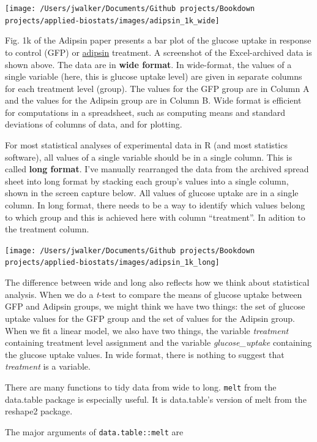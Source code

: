 \documentclass[]{book}
\begin{document}
\texttt{[image: /Users/jwalker/Documents/Github projects/Bookdown projects/applied-biostats/images/adipsin\_1k\_wide]}

Fig. 1k of the Adipsin paper presents a bar plot of the glucose uptake in response to control (GFP) or \href{https://en.wikipedia.org/wiki/Factor_D}{adipsin} treatment. A screenshot of the Excel-archived data is shown above. The data are in \textbf{wide format}. In wide-format, the values of a single variable (here, this is glucose uptake level) are given in separate columns for each treatment level (group). The values for the GFP group are in Column A and the values for the Adipsin group are in Column B. Wide format is efficient for computations in a spreadsheet, such as computing means and standard deviations of columns of data, and for plotting.

For most statistical analyses of experimental data in R (and most statistics software), all values of a single variable should be in a single column. This is called \textbf{long format}. I've manually rearranged the data from the archived spread sheet into long format by stacking each group's values into a single column, shown in the screen capture below. All values of glucose uptake are in a single column. In long format, there needs to be a way to identify which values belong to which group and this is achieved here with column ``treatment''. In adition to the treatment column.

\texttt{[image: /Users/jwalker/Documents/Github projects/Bookdown projects/applied-biostats/images/adipsin\_1k\_long]}

The difference between wide and long also reflects how we think about statistical analysis. When we do a \emph{t}-test to compare the means of glucose uptake between GFP and Adipsin groups, we might think we have two things: the set of glucose uptake values for the GFP group and the set of values for the Adipsin group. When we fit a linear model, we also have two things, the variable \emph{treatment} containing treatment level assignment and the variable \emph{glucose\_uptake} containing the glucose uptake values. In wide format, there is nothing to suggest that \emph{treatment} is a variable.

There are many functions to tidy data from wide to long. \texttt{melt} from the data.table package is especially useful. It is data.table's version of melt from the reshape2 package.

The major arguments of \texttt{data.table::melt} are
\end{document}
